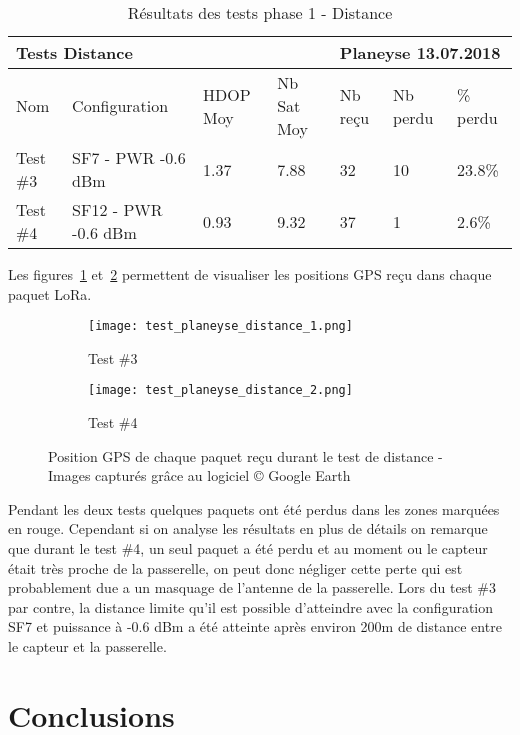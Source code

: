 \begin{table}[htb]
\caption[Résultats des tests phase 1 - Distance]{Résultats des tests phase 1 - Distance}
\label{tab:resultat_test_1_distance}
\centering
\begin{tabular}{lllllll}
\toprule
\multicolumn{4}{l}{ Tests Distance } & \multicolumn{3}{l}{ Planeyse 13.07.2018 } \\
\toprule
Nom & Configuration & HDOP Moy & Nb Sat Moy & Nb reçu & Nb perdu & \% perdu \\
\midrule
Test \#3 & SF7 - PWR -0.6 dBm & 1.37 & 7.88 & 32 & 10 & 23.8\% \\
Test \#4 & SF12 - PWR -0.6 dBm & 0.93 & 9.32 & 37 & 1 & 2.6\%  \\
\bottomrule 
\end{tabular}
\end{table}

Les figures~\ref{fig:test_distance_1} et~\ref{fig:test_distance_2} permettent de visualiser les positions GPS reçu dans chaque paquet LoRa.

\begin{figure}[htb]
\centering
\begin{subfigure}{.5\textwidth}
  \centering
  \texttt{[image: test\_planeyse\_distance\_1.png]}
  \caption{Test \#3}
  \label{fig:test_distance_1}
\end{subfigure}%
\begin{subfigure}{.5\textwidth}
  \centering
  \texttt{[image: test\_planeyse\_distance\_2.png]}
  \caption{Test \#4}
  \label{fig:test_distance_2}
\end{subfigure}
\caption[Positions GPS des tests distance]{Position GPS de chaque paquet reçu durant le test de distance - Images capturés grâce au logiciel © Google Earth}
\label{fig:test_distance}
\end{figure}

Pendant les deux tests quelques paquets ont été perdus dans les zones marquées en rouge. Cependant si on analyse les résultats en plus de détails on remarque que durant le test \#4, un seul paquet a été perdu et au moment ou le capteur était très proche de la passerelle, on peut donc négliger cette perte qui est probablement due a un masquage de l'antenne de la passerelle. 
Lors du test \#3 par contre, la distance limite qu'il est possible d'atteindre avec la configuration SF7 et puissance à -0.6 dBm a été atteinte après environ 200m de distance entre le capteur et la passerelle.

\section{Conclusions}

